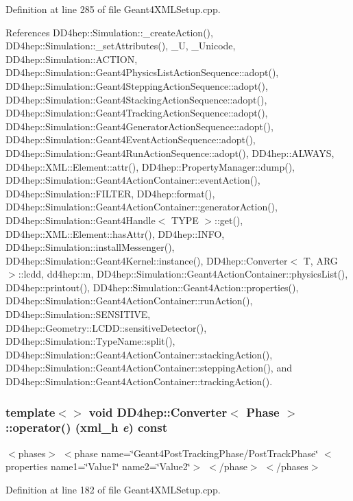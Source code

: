 Definition at line 285 of file Geant4XMLSetup.cpp.

References DD4hep::Simulation::\_\-createAction(), DD4hep::Simulation::\_\-setAttributes(), \_\-U, \_\-Unicode, DD4hep::Simulation::ACTION, DD4hep::Simulation::Geant4PhysicsListActionSequence::adopt(), DD4hep::Simulation::Geant4SteppingActionSequence::adopt(), DD4hep::Simulation::Geant4StackingActionSequence::adopt(), DD4hep::Simulation::Geant4TrackingActionSequence::adopt(), DD4hep::Simulation::Geant4GeneratorActionSequence::adopt(), DD4hep::Simulation::Geant4EventActionSequence::adopt(), DD4hep::Simulation::Geant4RunActionSequence::adopt(), DD4hep::ALWAYS, DD4hep::XML::Element::attr(), DD4hep::PropertyManager::dump(), DD4hep::Simulation::Geant4ActionContainer::eventAction(), DD4hep::Simulation::FILTER, DD4hep::format(), DD4hep::Simulation::Geant4ActionContainer::generatorAction(), DD4hep::Simulation::Geant4Handle$<$ TYPE $>$::get(), DD4hep::XML::Element::hasAttr(), DD4hep::INFO, DD4hep::Simulation::installMessenger(), DD4hep::Simulation::Geant4Kernel::instance(), DD4hep::Converter$<$ T, ARG $>$::lcdd, dd4hep::m, DD4hep::Simulation::Geant4ActionContainer::physicsList(), DD4hep::printout(), DD4hep::Simulation::Geant4Action::properties(), DD4hep::Simulation::Geant4ActionContainer::runAction(), DD4hep::Simulation::SENSITIVE, DD4hep::Geometry::LCDD::sensitiveDetector(), DD4hep::Simulation::TypeName::split(), DD4hep::Simulation::Geant4ActionContainer::stackingAction(), DD4hep::Simulation::Geant4ActionContainer::steppingAction(), and DD4hep::Simulation::Geant4ActionContainer::trackingAction().\hypertarget{struct_d_d4hep_1_1_converter_a33de33ebaf63b0a0c425f6edc4e50f68}{
\subsubsection[{operator()}]{\setlength{\rightskip}{0pt plus 5cm}template$<$$>$ void {\bf DD4hep::Converter}$<$ {\bf Phase} $>$::operator() ({\bf xml\_\-h} {\em e}) const}}
\label{struct_d_d4hep_1_1_converter_a33de33ebaf63b0a0c425f6edc4e50f68}
$<$phases$>$ $<$phase name=\char`\"{}Geant4PostTrackingPhase/PostTrackPhase\char`\"{} $<$properties name1=\char`\"{}Value1\char`\"{} name2=\char`\"{}Value2\char`\"{}$>$ $<$/phase$>$ $<$/phases$>$ 

Definition at line 182 of file Geant4XMLSetup.cpp.

